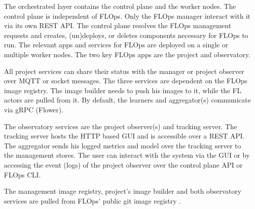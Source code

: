 The orchestrated layer contains the control plane and the worker nodes.
The control plane is independent of FLOps.
Only the FLOps manager interact with it via its own REST API.
The control plane resolves the FLOps management requests and creates, (un)deploys, or deletes components necessary for FLOps to run.
The relevant apps and services for FLOps are deployed on a single or multiple worker nodes.
The two key FLOps apps are the project and observatory.

All project services can share their status with the manager or project observer over MQTT or socket messages.
The three services are dependent on the FLOps image registry.
The image builder needs to push his images to it, while the FL actors are pulled from it.
By default, the learners and aggregator(s) communicate via gRPC (Flower).

The observatory services are the project observer(s) and tracking server.
The tracking server hosts the HTTP based GUI and is accessible over a REST API.
The aggregator sends his logged metrics and model over the tracking server to the management stores.
The user can interact with the system via the GUI or by accessing the event (logs) of the project observer over the control plane API or FLOps CLI.

The management image registry, project's image builder and both observatory services are pulled from FLOps' public git image registry \cite{flops_code}.